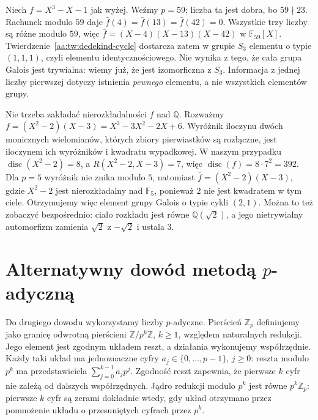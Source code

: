 \begin{przyklad}
Niech $f=X^3-X-1$ jak wyżej. Weźmy $p=59$; liczba ta jest dobra, bo $59\nmid23$. Rachunek
modulo $59$ daje $\bar f(4)=\bar f(13)=\bar f(42)=0$.
Wszystkie trzy liczby są różne modulo $59$, więc
$\bar f=(X-4)(X-13)(X-42)$ w $\mathbb F_{59}[X]$.
Twierdzenie~\ref{aa:tw:dedekind-cycle}
dostarcza zatem w grupie $S_3$ elementu o typie $(1,1,1)$,
czyli elementu identycznościowego. Nie wynika z tego,
że cała grupa Galois jest trywialna: wiemy już,
że jest izomorficzna z $S_3$. Informacja z jednej liczby
pierwszej dotyczy istnienia \emph{pewnego} elementu,
a nie wszystkich elementów grupy.
\end{przyklad}

\begin{przyklad}
\label{aa:prz:frob-reducible}
Nie trzeba zakładać nierozkładalności $f$ nad $\mathbb Q$.
Rozważmy
$f=(X^2-2)(X-3)=X^3-3X^2-2X+6$.
Wyróżnik iloczynu dwóch monicznych wielomianów, których
zbiory pierwiastków są rozłączne, jest iloczynem
ich wyróżników i kwadratu wypadkowej. W naszym przypadku
$\operatorname{disc}(X^2-2)=8$, a
$R(X^2-2,X-3)=7$, więc
$\operatorname{disc}(f)=8\cdot 7^2=392$.
Dla $p=5$ wyróżnik nie znika modulo $5$, natomiast
$\bar f=(X^2-2)(X-3)$, gdzie $X^2-2$ jest
nierozkładalny nad $\mathbb F_5$, ponieważ $2$ nie
jest kwadratem w tym ciele. Otrzymujemy więc element
grupy Galois o typie cykli $(2,1)$.
Można to też zobaczyć bezpośrednio: ciało rozkładu
jest równe $\mathbb Q(\sqrt 2)$, a jego nietrywialny
automorfizm zamienia $\sqrt2$ z $-\sqrt2$ i ustala $3$.
\end{przyklad}

\section{Alternatywny dowód metodą $p$-adyczną}
Do drugiego dowodu wykorzystamy liczby $p$-adyczne.
Pierścień $\mathbb Z_p$ definiujemy jako granicę odwrotną
pierścieni $\mathbb Z/p^k\mathbb Z$, $k\ge1$, względem naturalnych
redukcji. Jego element jest zgodnym układem reszt, a działania
wykonujemy współrzędnie. Każdy taki układ ma jednoznaczne cyfry
$a_j\in\{0,\ldots,p-1\}$, $j\ge0$: reszta modulo $p^k$ ma
przedstawiciela $\sum_{j=0}^{k-1}a_jp^j$. Zgodność reszt
zapewnia, że pierwsze $k$ cyfr nie zależą od dalszych współrzędnych.
Jądro redukcji modulo $p^k$ jest równe $p^k\mathbb Z_p$:
pierwsze $k$ cyfr są zerami dokładnie wtedy, gdy układ
otrzymano przez pomnożenie układu o przesuniętych cyfrach przez $p^k$.

